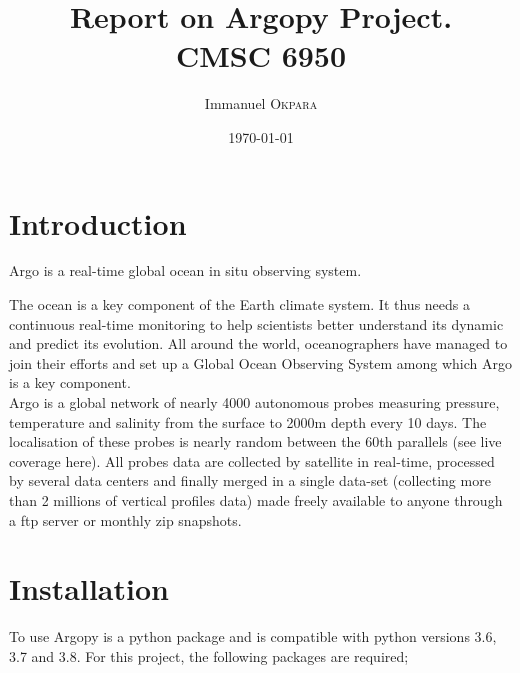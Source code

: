 \documentclass{article}
\title{Report on Argopy Project. \\ CMSC 6950} %
\author{Immanuel \textsc{Okpara}} %
\date{\today} %
\begin{document}
\maketitle %



\section{Introduction}

Argo is a real-time global ocean in situ observing system.

The ocean is a key component of the Earth climate system. It thus needs a continuous real-time monitoring to help scientists better understand its dynamic and predict its evolution. All around the world, oceanographers have managed to join their efforts and set up a Global Ocean Observing System among which Argo is a key component.\\

Argo is a global network of nearly 4000 autonomous probes measuring pressure, temperature and salinity from the surface to 2000m depth every 10 days. The localisation of these probes is nearly random between the 60th parallels (see live coverage here). All probes data are collected by satellite in real-time, processed by several data centers and finally merged in a single data-set (collecting more than 2 millions of vertical profiles data) made freely available to anyone through a ftp server or monthly zip snapshots.\\


\section{Installation}
To use Argopy is a python package and is compatible with python versions 3.6, 3.7 and 3.8. 
For this project, the following packages are required;
\end{document}
